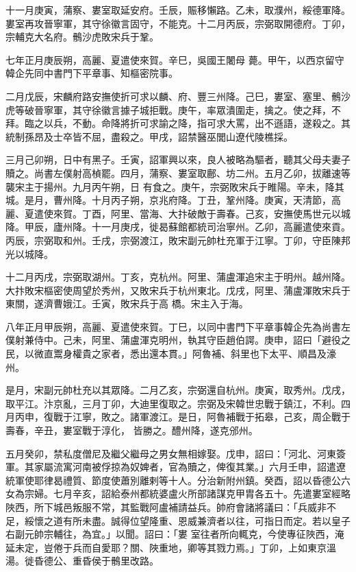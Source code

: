 \begin{pinyinscope}
 十一月庚寅，蒲察、婁室取延安府。壬辰，賑移懶路。乙未，取濮州，綏德軍降。婁室再攻晉寧軍，其守徐徽言固守，不能克。十二月丙辰，宗弼取開德府。丁卯，宗輔克大名府。鶻沙虎敗宋兵于鞏。



 七年正月庚辰朔，高麗、夏遣使來賀。辛巳，吳國王闍母
 薨。甲午，以西京留守韓企先同中書門下平章事、知樞密院事。



 二月戊辰，宋麟府路安撫使折可求以麟、府、豐三州降。己巳，婁室、塞里、鶻沙虎等破晉寧軍，其守徐徽言據子城拒戰。庚午，率眾潰圍走，擒之。使之拜，不拜。臨之以兵，不動。命降將折可求諭之降，指可求大罵，出不遜語，遂殺之。其統制孫昂及士卒皆不屈，盡殺之。甲戌，詔禁醫巫閭山遼代陵樵採。



 三月己卯朔，日中有黑子。壬寅，詔軍興以來，良人被略為驅者，聽其父母夫妻子贖之。尚書左僕射高楨罷。四月，蒲察、婁室取鄜、坊二州。五月乙卯，拔離速等襲宋主于揚州。九月丙午朔，日
 有食之。庚午，宗弼敗宋兵于睢陽。辛未，降其城。是月，曹州降。十月丙子朔，京兆府降。丁丑，鞏州降。庚寅，天清節，高麗、夏遣使來賀。丁酉，阿里、當海、大抃破敵于壽春。己亥，安撫使馬世元以城降。甲辰，廬州降。十一月庚戌，徙曷蘇館都統司治寧州。乙卯，高麗遣使來貢。丙辰，宗弼取和州。壬戌，宗弼渡江，敗宋副元帥杜充軍于江寧。丁卯，守臣陳邦光以城降。



 十二月丙戌，宗弼取湖州。丁亥，克杭州。阿里、蒲盧渾追宋主于明州。越州降。大抃敗宋樞密使周望於秀州，又敗宋兵于杭州東北。戊戌，阿里、蒲盧渾敗宋兵于東關，遂濟曹娥江。壬寅，敗宋兵于高
 橋。宋主入于海。



 八年正月甲辰朔，高麗、夏遣使來賀。丁巳，以同中書門下平章事韓企先為尚書左僕射兼侍中。己未，阿里、蒲盧渾克明州，執其守臣趙伯諤。庚申，詔曰「避役之民，以微直鬻身權貴之家者，悉出還本貫。」阿魯補、斜里也下太平、順昌及濠州。



 是月，宋副元帥杜充以其眾降。二月乙亥，宗弼還自杭州。庚寅，取秀州。戊戌，取平江。汴京亂，三月丁卯，大迪里復取之。宗弼及宋韓世忠戰于鎮江，不利。四月丙申，復戰于江寧，敗之。諸軍渡江。是日，阿魯補戰于拓皋，己亥，周企戰于壽春，辛丑，婁室戰于淳化，
 皆勝之。醴州降，遂克邠州。



 五月癸卯，禁私度僧尼及繼父繼母之男女無相嫁娶。戊申，詔曰：「河北、河東簽軍。其家屬流寓河南被俘掠為奴婢者，官為贖之，俾復其業。」六月壬申，詔遣遼統軍使耶律曷禮質、節度使蕭別離剌等十人。分治新附州鎮。癸酉，詔以昏德公六女為宗婦。七月辛亥，詔給泰州都統婆盧火所部諸謀克甲胄各五十。先遣婁室經略陜西，所下城邑叛服不常，其監戰阿盧補請益兵。帥府會諸將議曰：「兵威非不足，綏懷之道有所未盡。誠得位望隆重、恩威兼濟者以往，可指日而定。若以皇子右副元帥宗輔往，為宜。」以聞。詔曰：「婁
 室往者所向輒克，今使專征陜西，淹延未定，豈倦于兵而自愛耶？關、陜重地，卿等其戮力焉。」丁卯，上如東京溫湯。徙昏德公、重昏侯于鶻里改路。




\end{pinyinscope}
